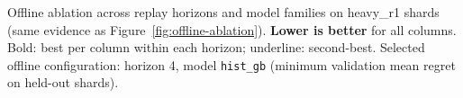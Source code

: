 \begin{table}[t]
\centering
\caption{Offline ablation across replay horizons and model families on heavy\_r1 shards (same evidence as Figure~\ref{fig:offline-ablation}). \textbf{Lower is better} for all columns. Bold: best per column within each horizon; underline: second-best. Selected offline configuration: horizon 4, model \texttt{hist\_gb} (minimum validation mean regret on held-out shards).}
\label{tab:offline-ablation}

\end{table}
